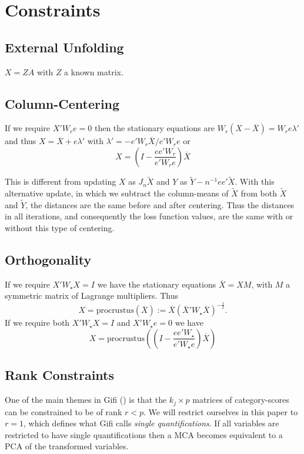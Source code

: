 \documentclass[
  12pt,
  letterpaper,
  DIV=11,
  numbers=noendperiod]{scrartcl}
\newcommand{\sectionbreak}{\clearpage}
\begin{document}
\sectionbreak

\section{Constraints}\label{constraints}

\subsection{External Unfolding}\label{external-unfolding}

\(X = ZA\) with \(Z\) a known matrix.

\subsection{Column-Centering}\label{column-centering}

If we require \(X'W_re = 0\) then the stationary equations are
\(W_r(X - \overline X) = W_re\lambda'\) and thus
\(X = \overline X + e\lambda'\) with
\(\lambda' = -e'W_r\overline X/e'W_re\) or \[
  X = (I - \frac{ee'W_r}{e'W_re})\overline X
\]

This is different from updating \(X\) as \(J_n\tilde X\) and \(Y\) as
\(\tilde Y - n^{-1}ee'\tilde X\). With this alternative update, in which
we subtract the column-means of \(\tilde X\) from both \(\tilde X\) and
\(\tilde Y\), the distances are the same before and after centering.
Thus the distances in all iterations, and consequently the loss function
values, are the same with or without this type of centering.

\subsection{Orthogonality}\label{orthogonality}

If we require \(X'W_\star X = I\) we have the stationary equations
\(\overline X = XM\), with \(M\) a symmetric matrix of Lagrange
multipliers. Thus \[
  X = \text{procrustus}(\overline X)
    := \overline X(\overline X'W_\star \overline X)^{-\frac12}.
\] If we require both \(X'W_\star X = I\) and \(X'W_\star e = 0\) we
have \[
  X = \text{procrustus}((I - \frac{ee'W_\star}{e'W_\star e})\overline X)
\]

\subsection{Rank Constraints}\label{rank-constraints}

One of the main themes in Gifi () is that
the \(k_j \times p\) matrices of category-scores can be constrained to
be of rank \(r < p\). We will restrict ourselves in this paper to
\(r = 1\), which defines what Gifi calls \emph{single quantifications}.
If all variables are restricted to have single quantifications then a
MCA becomes equivalent to a PCA of the transformed variables.
\end{document}
